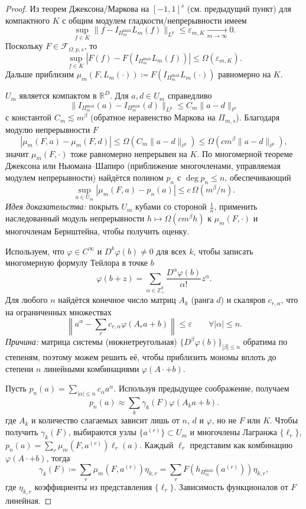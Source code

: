 \documentclass[../NDCNNAI_main.tex]{subfiles}
\begin{document}
\begin{proof}
  Из теорем Джексона/Маркова на $[-1, 1]^s$ (см. предыдущий пункт) для компактного $K$ с общим модулем гладкости/непрерывности имеем
  $$\sup_{f \in K} \|f - I_{\Pi_m^{\max}} L_m(f)\|_{L^p} \le \varepsilon_{m,K} \xrightarrow[m \to \infty]{} 0.$$
  Поскольку $F \in \mathcal{F}_{\Omega,p,s}$, то
  $$\sup_{f \in K} |F(f) - F(I_{\Pi_m^{\max}} L_m(f))| \le \Omega(\varepsilon_{m,K}).$$
  Дальше приблизим $\mu_m(F, L_m(\cdot)) \coloneq F(I_{\Pi_m^{\max}} L_m(\cdot))$ равномерно на $K$.

  $U_m$ является компактом в $\mathbb{R}^D$.
  Для $a, d \in U_m$ справедливо
  $$\|I_{\Pi_m^{\max}}(a) - I_{\Pi_m^{\max}}(d)\|_{L^p} \le C_m \|a - d\|_{\ell^p}$$
  с константой $C_m \lesssim m^\beta$ (обратное неравенство Маркова на $\Pi_{m,s}$).
  Благодаря модулю непрерывности $F$
  $$|\mu_m(F,a) - \mu_m(F,d)| \le \Omega(C_m \|a - d\|_{\ell^p}) \le \Omega(c m^\beta \|a - d\|_{\ell^p}),$$
  значит $\mu_m(F,\cdot)$ тоже равномерно непрерывен на $K$.
  По многомерной теореме Джексона или Ньюмана--Шапиро (приближение многочленами, управляемая модулем непрерывности) найдётся полином $p_n$ с $\operatorname*{deg} p_n \le n$, обеспечивающий
  $$\sup_{a \in U_m} |\mu_m(F,a) - p_n(a)| \le c \, \Omega(m^\beta / n).$$
  \emph{Идея доказательства:} покрыть $U_m$ кубами со стороной $\frac{1}{n}$, применить наследованный модуль непрерывности $h \mapsto \Omega(c m^\beta h)$ к $\mu_m(F,\cdot)$ и многочленам Бернштейна, чтобы получить оценку.

  Используем, что $\varphi \in C^\infty$ и $D^k \varphi(b) \neq 0$ для всех $k$, чтобы записать многомерную формулу Тейлора в точке $b$
  $$\varphi(b + z) = \sum_{\alpha \in \mathbb{Z}_+^d} \frac{D^\alpha \varphi(b)}{\alpha!} z^\alpha.$$
  Для любого $n$ найдётся конечное число матриц $A_k$ (ранга $d$) и скаляров $c_{r, \alpha}$, что на ограниченных множествах
  $$\left\| a^\alpha - \sum_{r} c_{r,\alpha} \varphi(A_r a + b) \right\| \le \varepsilon \qquad \forall |\alpha| \leq n.$$
  \emph{Причина:} матрица системы (нижнетреугольная) $\{D^\beta \varphi(b)\}_{|\beta| \le n}$ обратима по степеням, поэтому можем решить её, чтобы приблизить мономы вплоть до степени $n$ линейными комбинациями $\varphi(A \cdot + b)$.

  Пусть $p_n(a) = \sum_{|\alpha| \leq n} c_\alpha a^\alpha$.
  Используя предыдущее соображение, получаем
  $$p_n(a) \approx \sum_{k} \gamma_k(F) \varphi(A_k a + b).$$
  где $A_k$ и количество слагаемых зависит лишь от $n$, $d$ и $\varphi$, но не $F$ или $K$.
  Чтобы получить $\gamma_k(F)$, выбираются узлы $\{a^{(r)}\} \subset U_m$ и многочлены Лагранжа $\{\ell_r\}$, $p_n(a) = \sum_r \mu_m(F,a^{(r)}) \ell_r(a)$.
  Каждый $\ell_r$ представим как комбинацию $\varphi(A \cdot + b)$, тогда
  $$\gamma_k(F) \coloneq \sum_r \mu_m(F,a^{(r)}) \eta_{k,r} = \sum_r F(h_{\Pi_m^{\max}}(a^{(r)})) \eta_{k,r},$$
  где $\eta_{k,r}$ коэффициенты из представления $\{\ell_r\}$. Зависимость функционалов от $F$ линейная.


\end{proof}
\end{document}

